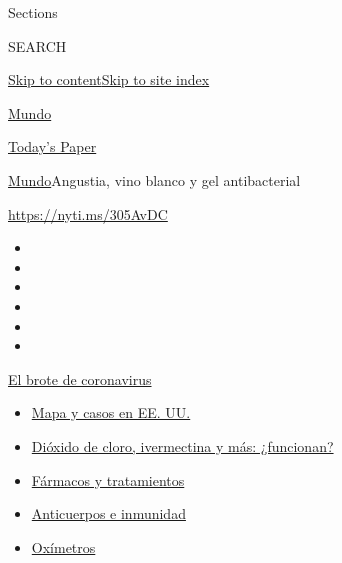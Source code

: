 Sections

SEARCH

\protect\hyperlink{site-content}{Skip to
content}\protect\hyperlink{site-index}{Skip to site index}

\href{https://www.nytimes.com/es/section/mundo}{Mundo}

\href{https://myaccount.nytimes.com/auth/login?response_type=cookie\&client_id=vi}{}

\href{https://www.nytimes.com/section/todayspaper}{Today's Paper}

\href{/es/section/mundo}{Mundo}\textbar{}Angustia, vino blanco y gel
antibacterial

\url{https://nyti.ms/305AvDC}

\begin{itemize}
\item
\item
\item
\item
\item
\item
\end{itemize}

\href{https://www.nytimes.com/es/spotlight/coronavirus?action=click\&pgtype=Article\&state=default\&region=TOP_BANNER\&context=storylines_menu}{El
brote de coronavirus}

\begin{itemize}
\tightlist
\item
  \href{https://www.nytimes.com/es/interactive/2020/espanol/mundo/coronavirus-en-estados-unidos.html?action=click\&pgtype=Article\&state=default\&region=TOP_BANNER\&context=storylines_menu}{Mapa
  y casos en EE. UU.}
\item
  \href{https://www.nytimes.com/es/2020/07/23/espanol/america-latina/bolivia-cloro-coronavirus-ivermectina.html?action=click\&pgtype=Article\&state=default\&region=TOP_BANNER\&context=storylines_menu}{Dióxido
  de cloro, ivermectina y más: ¿funcionan?}
\item
  \href{https://www.nytimes.com/es/interactive/2020/science/coronavirus-tratamientos-curas.html?action=click\&pgtype=Article\&state=default\&region=TOP_BANNER\&context=storylines_menu}{Fármacos
  y tratamientos}
\item
  \href{https://www.nytimes.com/es/2020/07/28/espanol/ciencia-y-tecnologia/anticuerpos-coronavirus-inmunidad.html?action=click\&pgtype=Article\&state=default\&region=TOP_BANNER\&context=storylines_menu}{Anticuerpos
  e inmunidad}
\item
  \href{https://www.nytimes.com/es/2020/04/29/espanol/estilos-de-vida/oximetro-para-que-sirve.html?action=click\&pgtype=Article\&state=default\&region=TOP_BANNER\&context=storylines_menu}{Oxímetros}
\end{itemize}

